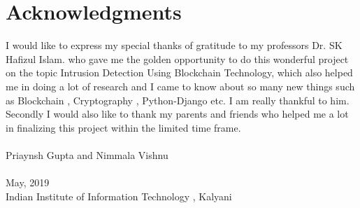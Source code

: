 \cleardoublepage
{}
{}
\chapter*{Acknowledgments}
\vspace{1.0in}
I would like to express my special thanks of gratitude to my professors Dr. SK Hafizul Islam. who gave me the golden opportunity to do this wonderful project on the topic Intrusion Detection Using Blockchain Technology, which also helped me in doing a lot of research and I came to know about so many new things such as Blockchain , Cryptography , Python-Django etc. I am really thankful to him.
Secondly I would also like to thank my parents and friends who helped me a lot in finalizing this project within the limited time frame. \\
\\Priaynsh Gupta and Nimmala Vishnu
\\
\\May, 2019\\
{Indian Institute of Information Technology , Kalyani}\\
\newpage
